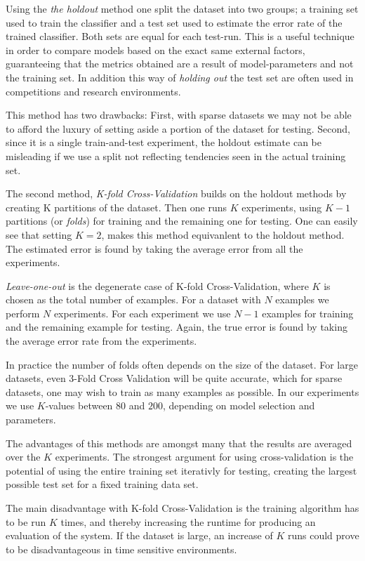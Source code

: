 Using the \textit{the holdout} method one split the dataset into two groups; a
training set used to train the classifier and a test set used to estimate the
error rate of the trained classifier. Both sets are equal for each test-run.
This is a useful technique in order to compare models based on the exact same
external factors, guaranteeing that the metrics obtained are a result of
model-parameters and not the training set. In addition this way of
\textit{holding out} the test set are often used in competitions and research
environments.

This method has two drawbacks: First, with sparse datasets we may not be able
to afford the luxury of setting aside a portion of the dataset for testing.
Second, since it is a single train-and-test experiment, the holdout estimate
can be misleading if we use a split not reflecting tendencies seen in the
actual training set.

The second method, \textit{K-fold Cross-Validation} builds on the holdout
methods by creating K partitions of the dataset. Then one runs $K$ experiments,
using $K-1$ partitions (or \textit{folds}) for training and the remaining one
for testing. One can easily see that setting $K=2$, makes this method
equivanlent to the holdout method. The estimated error is found by taking the
average error from all the experiments.

\textit{Leave-one-out} is the degenerate case of K-fold Cross-Validation, where
$K$ is chosen as the total number of examples. For a dataset with $N$ examples
we perform $N$ experiments. For each experiment we use $N-1$ examples for
training and the remaining example for testing. Again, the true error is found
by taking the average error rate from the experiments.

In practice the number of folds often depends on the size of the dataset. For
large datasets, even 3-Fold Cross Validation will be quite accurate, which for
sparse datasets, one may wish to train as many examples as possible. In our
experiments we use $K$-values between $80$ and $200$, depending on model
selection and parameters. 

The advantages of this methods are amongst many that the results are averaged
over the $K$ experiments. The strongest argument for using cross-validation is
the potential of using the entire training set iterativly for testing, creating
the largest possible test set for a fixed training data set.

The main disadvantage with K-fold Cross-Validation is the training algorithm
has to be run $K$ times, and thereby increasing the runtime for producing an
evaluation of the system. If the dataset is large, an increase of $K$ runs
could prove to be disadvantageous in time sensitive environments.

